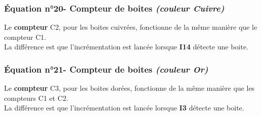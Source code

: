 \subsubsection{Équation n°20- Compteur de boites \textit{(couleur Cuivre)}}
\label{sec:eq20}

Le \textbf{compteur} C2, pour les boites cuivrées, fonctionne de la même manière que le compteur C1.\\
La différence est que l'incrémentation est lancée lorsque \textbf{I14} détecte une boite.


\subsubsection{Équation n°21- Compteur de boites \textit{(couleur Or)}}
\label{sec:eq21}

Le \textbf{compteur} C3, pour les boites dorées, fonctionne de la même manière que les compteurs C1 et C2.\\
La différence est que l'incrémentation est lancée lorsque \textbf{I3} détecte une boite.
